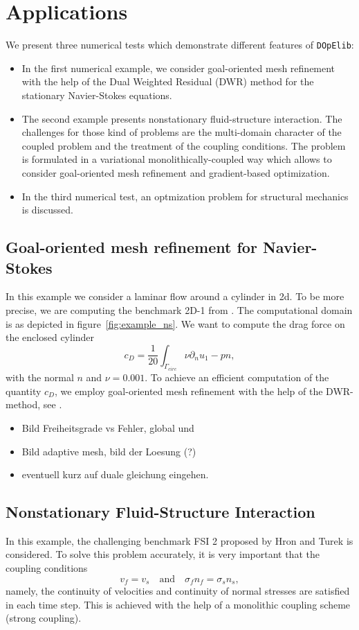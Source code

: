 \documentclass[prodmode,acmtoms]{acmsmall}
\numberwithin{equation}{section}
\newcommand{\dope}{\texttt{DOpElib}}
\begin{document}
\section{Applications}
\label{applications}
We present three numerical tests which demonstrate different
features of \dope{}:
\begin{itemize}
\item In the first numerical example, we consider 
goal-oriented mesh refinement with the help of the 
Dual Weighted Residual (DWR) method for the stationary Navier-Stokes equations.
\item The second example presents nonstationary fluid-structure 
interaction. The challenges for those kind of problems are the multi-domain
character of the coupled problem and the treatment of the coupling conditions.
The problem is formulated in a variational monolithically-coupled way which 
allows to consider goal-oriented mesh refinement and gradient-based optimization.
\item In the third numerical test, an optmization problem for structural mechanics
is discussed.
\end{itemize}

\subsection{Goal-oriented mesh refinement for Navier-Stokes}
In this example we consider a laminar flow around a cylinder in 2d. To be more precise, we are computing the benchmark 2D-1 from \cite{TuSchae96}. The computational domain is as depicted in figure~\ref{fig:example_ns}. We want to compute the drag force on the enclosed cylinder
\begin{equation}
c_D = \frac 1 {20} \int_{\Gamma_{circ}} \nu\partial_nu _1 - pn,
\end{equation}
with the normal $n$ and $\nu = 0.001$. To achieve an efficient computation of the quantity $c_D$, we employ goal-oriented mesh refinement with the help of the DWR-method, see \cite{BeRa96}.

\begin{itemize}
\item Bild Freiheitsgrade vs Fehler, global und 
\item Bild adaptive mesh, bild der Loesung (?)
\item eventuell kurz auf duale gleichung eingehen.
\end{itemize}

\subsection{Nonstationary Fluid-Structure Interaction}
In this example, the challenging benchmark FSI 2
proposed by Hron and Turek \cite{HrTu06b} is considered.
To solve this problem accurately, it is very important that 
the coupling conditions
\[
v_f = v_s \quad \text{and} \quad \sigma_f n_f = \sigma_s n_s, 
\]
namely, the continuity of velocities and continuity of normal stresses
are satisfied in each time step. This is achieved with the help of 
a monolithic coupling scheme (strong coupling).
\end{document}
